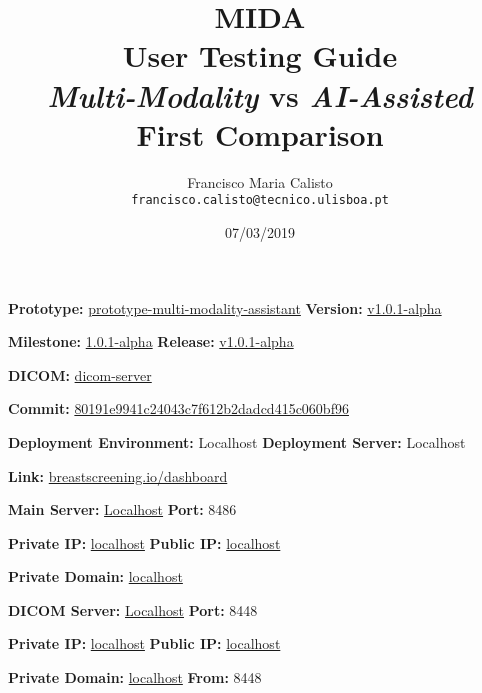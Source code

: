 \documentclass{article}
\title{
MIDA
\\
User Testing Guide
\\
\textit{Multi-Modality} vs \textit{AI-Assisted}
\\
First Comparison
}
\author{
Francisco Maria Calisto\\
\texttt{francisco.calisto@tecnico.ulisboa.pt}
}
\date{07/03/2019}
\begin{document}
\maketitle

\textbf{Prototype:} \hyperlink{https://github.com/mida-project/prototype-multi-modality-assistant}{prototype-multi-modality-assistant} \hfill \textbf{Version:} \hyperlink{https://github.com/mida-project/prototype-multi-modality-assistant/tree/9a912aea8d156f53e846b15bb29a09fc046bd731}{v1.0.1-alpha}

\textbf{Milestone:} \hyperlink{https://github.com/mida-project/prototype-multi-modality-assistant/milestone/1}{1.0.1-alpha} \hfill \textbf{Release:} \hyperlink{https://github.com/mida-project/prototype-multi-modality-assistant/releases/tag/v1.0.1-alpha}{v1.0.1-alpha}

\hfill

\textbf{DICOM:} \hyperlink{https://github.com/MIMBCD-UI/dicom-server}{dicom-server}

\textbf{Commit:} \hyperlink{https://github.com/MIMBCD-UI/dicom-server/tree/80191e9941c24043c7f612b2dadcd415c060bf96}{80191e9941c24043c7f612b2dadcd415c060bf96}

\hfill

\textbf{Deployment Environment:} Localhost \hfill \textbf{Deployment Server:} Localhost

\textbf{Link:} \hyperlink{http://www.breastscreening.io/dashboard/}{breastscreening.io/dashboard}

\hfill

\textbf{Main Server:} \hyperlink{http://localhost:8486/src/public/index.html}{Localhost} \hfill \textbf{Port:} 8486

\textbf{Private IP:} \hyperlink{http://localhost:8486/src/public/index.html}{localhost} \hfill \textbf{Public IP:} \hyperlink{http://localhost:8486/src/public/index.html}{localhost}

\textbf{Private Domain:} \hyperlink{http://localhost:8486/src/public/index.html}{localhost}

\hfill

\textbf{DICOM Server:} \hyperlink{http://localhost:8448/app/explorer.html}{Localhost} \hfill \textbf{Port:} 8448

\textbf{Private IP:} \hyperlink{http://localhost:8448/app/explorer.html}{localhost} \hfill \textbf{Public IP:} \hyperlink{http://localhost:8448/app/explorer.html}{localhost}

\textbf{Private Domain:} \hyperlink{http://localhost:8448/app/explorer.html}{localhost} \hfill \textbf{From:} 8448

\clearpage











\clearpage



\end{document}
